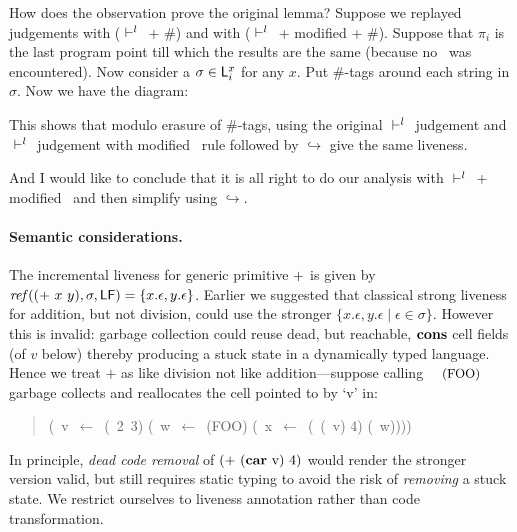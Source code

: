 {How does  the observation prove  the original lemma?   Suppose we
replayed  judgements  with  ($\ \vdash^l\ $  +  \#) and  with  ($\ \vdash^l\ $  +
modified \CONS +  \#).  Suppose that $\pi_i$ is  the last program
point till which the results  are the same (because no \CONS\ was
encountered).  Now  consider a  $\sigma \in \mathsf{L}_{{i}}^{x}$  for any
$x$.  Put \#-tags around each string in $\sigma$. Now we have the
diagram:

\centerline{}


This shows that modulo erasure of \#-tags, using the original $\ \vdash^l\ $
judgement and  $\ \vdash^l\ $ judgement with modified \CONS\ rule followed by
$\hookrightarrow$ give the same liveness. 
   
And I would like  to conclude that it is all right  to do our analysis
with $\ \vdash^l\ $ + modified \CONS\ and then simplify using $\hookrightarrow$.

}

{\color{blue}
\paragraph{Semantic considerations.}
The incremental liveness for generic primitive $\mbox{$\mathbf{ +}$}$ is given by
$\mathit{ref\/}((\mbox{$\mathbf{ +}$}~x~y),\sigma,\mathsf{LF}) = 
           \{x.\epsilon,y.\epsilon\}$.
Earlier we suggested that classical strong liveness for addition,
but not division, could use the stronger
$ \{x.\epsilon,y.\epsilon \mid \epsilon \in \sigma\}$.
However this is invalid: garbage collection
could reuse dead, but reachable, $\mbox{$\mathbf{cons}$}$ cell fields (of $v$ below)
thereby producing a stuck state in a dynamically typed language.
Hence we treat $+$ as like division not like addition---suppose
calling $\mbox{\footnotesize (FOO)}$ garbage collects and reallocates the cell pointed
to by `v' in:

\vspace{-15pt}

\begin{quote}
\footnotesize
\renewcommand{\arraystretch}{1}{
	  \begin{uprogram}
	    (\LET\ v\ $\leftarrow $\ (\CONS~2~3) \IN
	    (\LET\ w\ $\leftarrow $\ (FOO) \IN
	    (\LET\ x\ $\leftarrow $\ (\PRIM\ (\CAR\ v) 4) \IN
	    (\RETURN\ w))))
	\end{uprogram}}
\end{quote}
In principle, {\em dead code removal} of
$(\mbox{$\mathbf{ +}$}\ (\mbox{$\mathbf{car}$}\ {\rm v})\ 4)$
would render the stronger version valid, but still requires static typing
to avoid the risk of {\em removing} a stuck state.
We restrict ourselves to liveness annotation rather than code transformation.
}


